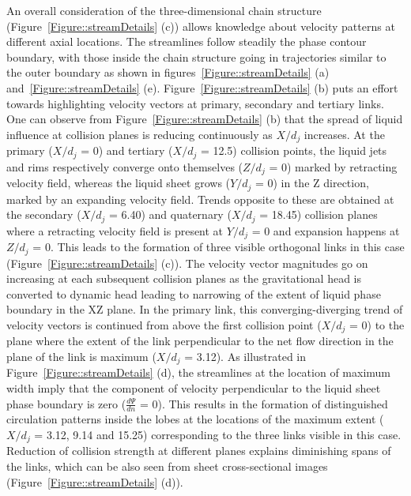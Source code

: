 An overall consideration of the three-dimensional chain structure (Figure~\ref{Figure::streamDetails} (c)) allows knowledge about velocity patterns at different axial locations. The streamlines follow steadily the phase contour boundary, with those inside the chain structure going in trajectories similar to the outer boundary as shown in figures~\ref{Figure::streamDetails} (a) and~\ref{Figure::streamDetails} (e). Figure~\ref{Figure::streamDetails} (b) puts an effort towards highlighting velocity vectors at primary, secondary and tertiary links. One can observe from Figure~\ref{Figure::streamDetails} (b) that the spread of liquid influence at collision planes is reducing continuously as $X/d_j$ increases.  At the primary ($X/d_j$ = 0) and tertiary ($X/d_j$ = 12.5) collision points, the liquid jets and rims respectively converge onto themselves ($Z/d_j$ = 0) marked by retracting velocity field, whereas the liquid sheet grows ($Y/d_j$ = 0) in the Z direction, marked by an expanding velocity field. Trends opposite to these are obtained at the secondary ($X/d_j$ = 6.40) and quaternary ($X/d_j$ = 18.45) collision planes where a retracting velocity field is present at $Y/d_j$ = 0 and expansion happens at $Z/d_j$ = 0. This leads to the formation of three visible orthogonal links in this case (Figure~\ref{Figure::streamDetails} (c)). The velocity vector magnitudes go on increasing at each subsequent collision planes as the gravitational head is converted to dynamic head leading to narrowing of the extent of liquid phase boundary in the XZ plane. In the primary link, this converging-diverging trend of velocity vectors is continued from above the first collision point ($X/d_j$ = 0) to the plane where the extent of the link perpendicular to the net flow direction in the plane of the link is maximum ($X/d_j$ = 3.12). As illustrated in Figure~\ref{Figure::streamDetails} (d), the streamlines at the location of maximum width imply that the component of velocity perpendicular to the liquid sheet phase boundary is zero ($\frac{d\Psi}{dn}$ = 0). This results in the formation of distinguished circulation patterns inside the lobes at the locations of the maximum extent ($X/d_j$ = 3.12, 9.14 and 15.25) corresponding to the three links visible in this case. Reduction of collision strength at different planes explains diminishing spans of the links, which can be also seen from sheet cross-sectional images (Figure~\ref{Figure::streamDetails} (d)).\\
